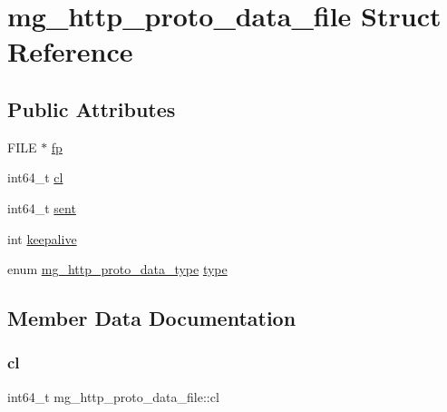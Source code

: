 \hypertarget{structmg__http__proto__data__file}{}\section{mg\+\_\+http\+\_\+proto\+\_\+data\+\_\+file Struct Reference}
\label{structmg__http__proto__data__file}
\subsection*{Public Attributes}
\begin{DoxyCompactItemize}
\item 
F\+I\+LE $\ast$ \hyperlink{structmg__http__proto__data__file_a3c2842046c2608a6c0c3019516b6f5a4_a3c2842046c2608a6c0c3019516b6f5a4}{fp}
\item 
int64\+\_\+t \hyperlink{structmg__http__proto__data__file_a68d6d737e984334010c34a2ec49786c2_a68d6d737e984334010c34a2ec49786c2}{cl}
\item 
int64\+\_\+t \hyperlink{structmg__http__proto__data__file_a7e291f2aa92c71cde4120c3e08fc5705_a7e291f2aa92c71cde4120c3e08fc5705}{sent}
\item 
int \hyperlink{structmg__http__proto__data__file_a16b68614dc21d136126ec9a6b7524dee_a16b68614dc21d136126ec9a6b7524dee}{keepalive}
\item 
enum \hyperlink{mongoose_8c_add7d33f71bab19f76742bd7b30f389e3_add7d33f71bab19f76742bd7b30f389e3}{mg\+\_\+http\+\_\+proto\+\_\+data\+\_\+type} \hyperlink{structmg__http__proto__data__file_a85da9b61dc998cbf4be7e276fb96d164_a85da9b61dc998cbf4be7e276fb96d164}{type}
\end{DoxyCompactItemize}


\subsection{Member Data Documentation}
\mbox{\label{structmg__http__proto__data__file_a68d6d737e984334010c34a2ec49786c2_a68d6d737e984334010c34a2ec49786c2}} 
\subsubsection{\texorpdfstring{cl}{cl}}
{\footnotesize\ttfamily int64\+\_\+t mg\+\_\+http\+\_\+proto\+\_\+data\+\_\+file\+::cl}

